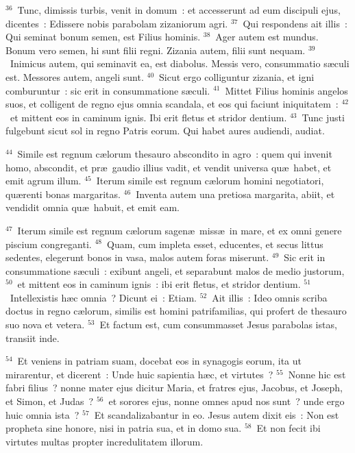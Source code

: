 ${}^{36}$~Tunc, dimissis turbis, venit in domum~: et accesserunt ad eum discipuli ejus, dicentes~: Edissere nobis parabolam zizaniorum agri.
${}^{37}$~Qui respondens ait illis~: Qui seminat bonum semen, est Filius hominis.
${}^{38}$~Ager autem est mundus. Bonum vero semen, hi sunt filii regni. Zizania autem, filii sunt nequam.
${}^{39}$~Inimicus autem, qui seminavit ea, est diabolus. Messis vero, consummatio s\ae culi est. Messores autem, angeli sunt.
${}^{40}$~Sicut ergo colliguntur zizania, et igni comburuntur~: sic erit in consummatione s\ae culi.
${}^{41}$~Mittet Filius hominis angelos suos, et colligent de regno ejus omnia scandala, et eos qui faciunt iniquitatem~:
${}^{42}$~et mittent eos in caminum ignis. Ibi erit fletus et stridor dentium.
${}^{43}$~Tunc justi fulgebunt sicut sol in regno Patris eorum. Qui habet aures audiendi, audiat.


${}^{44}$~Simile est regnum c\ae lorum thesauro abscondito in agro~: quem qui invenit homo, abscondit, et pr\ae\ gaudio illius vadit, et vendit universa qu\ae\ habet, et emit agrum illum.
${}^{45}$~Iterum simile est regnum c\ae lorum homini negotiatori, qu\ae renti bonas margaritas.
${}^{46}$~Inventa autem una pretiosa margarita, abiit, et vendidit omnia qu\ae\ habuit, et emit eam.


${}^{47}$~Iterum simile est regnum c\ae lorum sagen\ae\ miss\ae\ in mare, et ex omni genere piscium congreganti.
${}^{48}$~Quam, cum impleta esset, educentes, et secus littus sedentes, elegerunt bonos in vasa, malos autem foras miserunt.
${}^{49}$~Sic erit in consummatione s\ae culi~: exibunt angeli, et separabunt malos de medio justorum,
${}^{50}$~et mittent eos in caminum ignis~: ibi erit fletus, et stridor dentium.
${}^{51}$~Intellexistis h\ae c omnia~? Dicunt ei~: Etiam.
${}^{52}$~Ait illis~: Ideo omnis scriba doctus in regno c\ae lorum, similis est homini patrifamilias, qui profert de thesauro suo nova et vetera.
${}^{53}$~Et factum est, cum consummasset Jesus parabolas istas, transiit inde.


${}^{54}$~Et veniens in patriam suam, docebat eos in synagogis eorum, ita ut mirarentur, et dicerent~: Unde huic sapientia h\ae c, et virtutes~?
${}^{55}$~Nonne hic est fabri filius~? nonne mater ejus dicitur Maria, et fratres ejus, Jacobus, et Joseph, et Simon, et Judas~?
${}^{56}$~et sorores ejus, nonne omnes apud nos sunt~? unde ergo huic omnia ista~?
${}^{57}$~Et scandalizabantur in eo. Jesus autem dixit eis~: Non est propheta sine honore, nisi in patria sua, et in domo sua.
${}^{58}$~Et non fecit ibi virtutes multas propter incredulitatem illorum.

